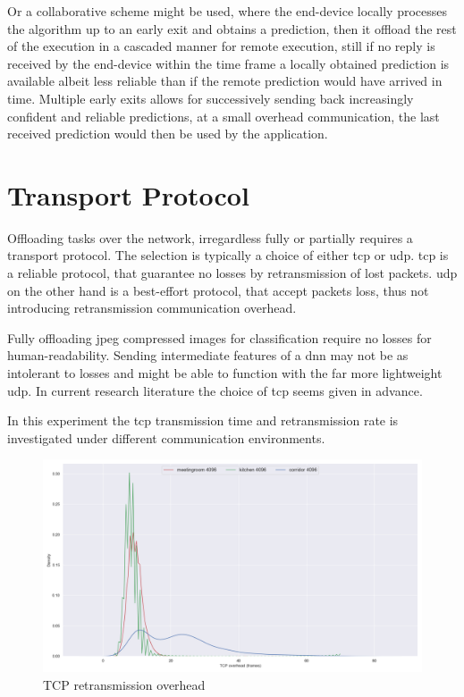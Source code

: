 Or a collaborative scheme might be used, where the end-device locally processes the algorithm up to an early exit and obtains a prediction, then it offload the rest of the execution in a cascaded manner for remote execution, still if no reply is received by the end-device within the time frame a locally obtained prediction is available albeit less reliable than if the remote prediction would have arrived in time. Multiple early exits allows for successively sending back increasingly confident and reliable predictions, at a small overhead communication, the last received prediction would then be used by the application.    
 

\section{Transport Protocol} 

Offloading tasks over the network, irregardless fully or partially requires a transport protocol. The selection is typically a choice of either \gls{tcp} or \gls{udp}. \gls{tcp} is a reliable protocol, that guarantee no losses by retransmission of lost packets. \gls{udp} on the other hand is a best-effort protocol, that accept packets loss, thus not introducing retransmission communication overhead. 


Fully offloading \gls{jpeg} compressed images for classification require no losses for human-readability. Sending intermediate features of a \gls{dnn} may not be as intolerant to losses and might be able to function with the far more lightweight \gls{udp}. In current research literature the choice of \gls{tcp} seems given in advance.  

In this experiment the \gls{tcp} transmission time and retransmission rate is investigated under different communication environments. 

\begin{figure}
	\centering
	\includegraphics[width=\linewidth]{figures/tcp/tcpoverhead}
	\caption[TCP retransmission overhead]{TCP retransmission overhead}
\end{figure}
